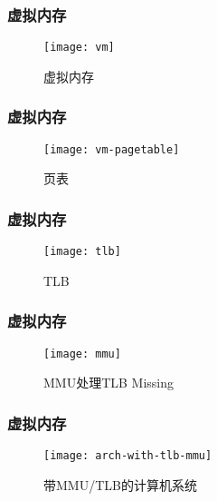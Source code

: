 \begin{frame}[plain]
	
	\frametitle{虚拟内存}
	
	\begin{figure}
		\centering
		\texttt{[image: vm]}
		\caption{虚拟内存}
	\end{figure}
	
\end{frame}

\begin{frame}[plain]
	
	\frametitle{虚拟内存}
	
	\begin{figure}
		\centering
		\texttt{[image: vm-pagetable]}
		\caption{页表}
	\end{figure}
	
\end{frame}

\begin{frame}
	
	\frametitle{虚拟内存}
	
	\begin{figure}
		\centering
		\texttt{[image: tlb]}
		\caption{TLB}
	\end{figure}
	
\end{frame}

\begin{frame}[plain]
	
	\frametitle{虚拟内存}
	
	\begin{figure}
		\centering
		\texttt{[image: mmu]}
		\caption{MMU处理TLB Missing}
	\end{figure}
	
\end{frame}

\begin{frame}[plain]
	
	\frametitle{虚拟内存}
	
	\begin{figure}
		\centering
		\texttt{[image: arch-with-tlb-mmu]}
		\caption{带MMU/TLB的计算机系统}
	\end{figure}
	
\end{frame}


